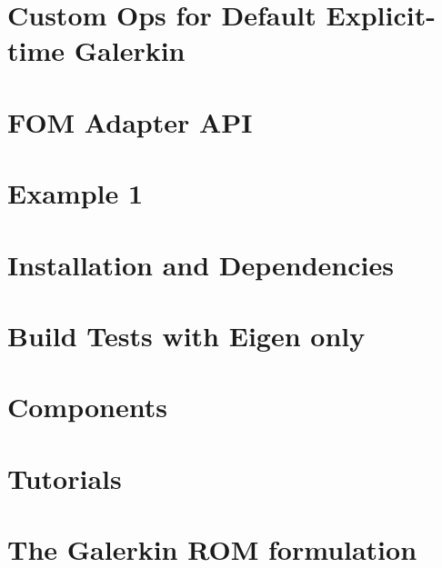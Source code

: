 \let\mypdfximage\pdfximage\def\pdfximage{\immediate\mypdfximage}\documentclass[twoside]{book}
\newcommand{\+}{\discretionary{\mbox{\scriptsize$\hookleftarrow$}}{}{}}
\begin{document}
\chapter{Custom Ops for Default Explicit-\/time Galerkin}
\label{md_pages_revise_and_pick_custom_ops_default_gal_exp}

\chapter{FOM Adapter API}
\label{md_pages_revise_and_pick_custom_ops}

\chapter{Example 1}
\label{md_pages_revise_and_pick_examples_example1}

\chapter{Installation and Dependencies}
\label{md_pages_revise_and_pick_getstarted_build_and_install}

\chapter{Build Tests with Eigen only}
\label{md_pages_revise_and_pick_getstarted_build_tests_eigen}

\chapter{Components}
\label{md_pages_revise_and_pick_getstarted_packages}

\chapter{Tutorials}
\label{md_pages_revise_and_pick_tutorials}

\chapter{The Galerkin ROM formulation}
\label{md_pages_revise_and_pick_various_formulation_galerkin}

\end{document}
